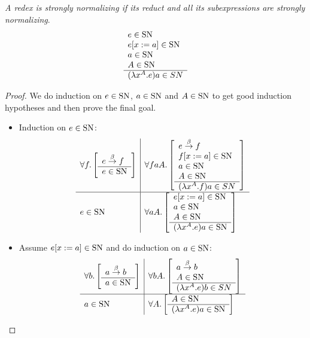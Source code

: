 \begin{theorem}
    \label{StronglyNormalizingRedex}
    \emph{A redex is strongly normalizing if its reduct and all its
    subexpressions are strongly normalizing}.
    $$
    \begin{array}{l} 
        e \in \text{SN}
        \\
        e[x:=a] \in \text{SN}
        \\
        a \in \text{SN}
        \\
        A \in \text{SN}
     \\ \hline 
        (\lambda x^A.e) a \in SN
    \end{array}
    $$

    \begin{proof}
        We do induction on $e \in \text{SN}$, $a \in \text{SN}$ and $A \in \text{SN}$ to get good
        induction hypotheses and then prove the final goal.

        \begin{itemize}
        \item Induction on $e \in \text{SN}$:
            $$
            \begin{array}{l|l}
                \forall f. \left[ \begin{array}{l} e \stackrel{\beta}{\to} f \\ \hline e \in \text{SN}\end{array} \right]
                &
                \forall faA. \left[ \begin{array}{l} 
                    e \stackrel{\beta}{\to} f
                    \\
                    f[x:=a] \in \text{SN}
                    \\
                    a \in \text{SN}
                    \\
                    A \in \text{SN}
                 \\ \hline (\lambda x^A. f)a \in SN\end{array} \right]
                \\
                \hline
                e \in \text{SN}
                &
                \forall aA. \left[ \begin{array}{l} 
                    e[x:=a] \in \text{SN}
                    \\
                    a \in \text{SN}
                    \\
                    A \in \text{SN}
                 \\ \hline (\lambda x^A.e) a \in \text{SN}\end{array} \right]
            \end{array}
            $$

        \item Assume $e[x:=a] \in \text{SN}$ and do induction on $a \in \text{SN}$:
            $$
            \begin{array}{l|l}
                \forall b. \left[ \begin{array}{l} a \stackrel{\beta}{\to} b \\ \hline a \in \text{SN}\end{array} \right]
                &
                \forall bA. \left[ \begin{array}{l} 
                    a \stackrel{\beta}{\to} b
                    \\
                    A \in \text{SN}
                 \\ \hline (\lambda x^A. e)b \in SN\end{array} \right]
                \\
                \hline
                a \in \text{SN}
                &
                \forall A. \left[ \begin{array}{l} 
                    A \in \text{SN}
                 \\ \hline (\lambda x^A.e) a \in \text{SN}\end{array} \right]
            \end{array}
            $$


\end{itemize}
\end{proof}
\end{theorem}
